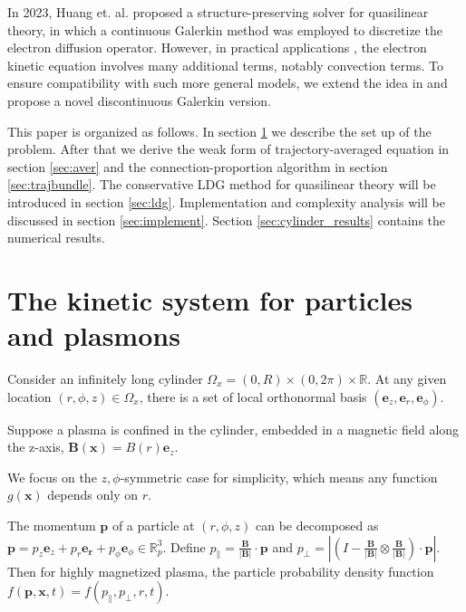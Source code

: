 \documentclass{article}
\numberwithin{equation}{section}
\begin{document}
In 2023, Huang et. al. \cite{huang2023conservative} proposed a structure-preserving solver for quasilinear theory, in which a continuous Galerkin method was employed to discretize the electron diffusion operator. However, in practical applications \cite{breizman_physics_2019}, the electron kinetic equation involves many additional terms, notably convection terms. To ensure compatibility with such more general models, we extend the idea in \cite{huang2023conservative} and propose a novel discontinuous Galerkin version.

This paper is organized as follows. In section \ref{sec:formulation} we describe the set up of the problem. After that we derive the weak form of trajectory-averaged equation in section \ref{sec:aver} and the connection-proportion algorithm in section \ref{sec:trajbundle}. The conservative LDG method for quasilinear theory will be introduced in section \ref{sec:ldg}. Implementation and complexity analysis will be discussed in section \ref{sec:implement}. Section \ref{sec:cylinder_results} contains the numerical results. 



\section{The kinetic system for particles and plasmons} \label{sec:formulation}

Consider an infinitely long cylinder $\Omega_{x}=(0,R)\times(0,2\pi)\times\mathbb{R}$. At any given location $(r,\phi,z)\in\Omega_{x}$, there is a set of local
orthonormal basis $(\mathbf{e}_{z},\mathbf{e}_{r},\mathbf{e}_{\phi})$. 


Suppose a plasma is confined in the cylinder, embedded in a magnetic field along the z-axis, $\mathbf{B}(\mathbf{x})=B(r)\mathbf{e}_{z}$.

We focus on the $z,\phi$-symmetric case for simplicity, which means any function $g(\mathbf{x})$ depends only on $r$.

The momentum $\mathbf{p}$ of a particle at $(r,\phi,z)$ can be decomposed as $\mathbf{p}=p_{z}\mathbf{e}_{z}+p_{r}\mathbf{e_{r}}+p_{\phi}\mathbf{e}_{\phi} \in \mathbb{R}_{p}^{3}$.  Define $p_{\parallel}=\frac{\mathbf{B}}{|\mathbf{B}|}\cdot\mathbf{p}$ and $p_{\perp}=\left\vert\left(I-\frac{\mathbf{B}}{|\mathbf{B}|}\otimes\frac{\mathbf{B}}{|\mathbf{B}|}\right)\cdot\mathbf{p}\right\vert$. Then for highly magnetized plasma, the particle probability density function $f(\mathbf{p},\mathbf{x},t)=f(p_{\parallel},p_{\perp},r,t)$.
\end{document}
